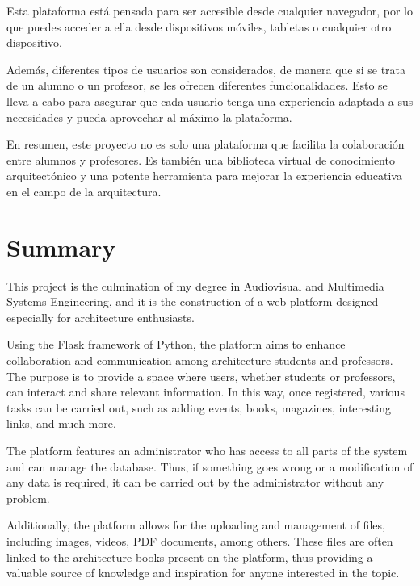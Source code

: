 \documentclass[a4paper, 12pt]{book}
\begin{document}
Esta plataforma está pensada para ser accesible desde cualquier navegador, por lo que puedes acceder a ella desde dispositivos móviles, 
tabletas o cualquier otro dispositivo. 

Además, diferentes tipos de usuarios son considerados, de manera que si se trata de un alumno o un profesor, se les ofrecen diferentes 
funcionalidades. Esto se lleva a cabo para asegurar que cada usuario tenga una experiencia adaptada a sus necesidades y pueda aprovechar 
al máximo la plataforma.

En resumen, este proyecto no es solo una plataforma que facilita la colaboración entre alumnos y profesores. Es también 
una biblioteca virtual de conocimiento arquitectónico y una potente herramienta para mejorar la experiencia educativa en el 
campo de la arquitectura.


\chapter*{Summary}

This project is the culmination of my degree in Audiovisual and Multimedia Systems Engineering, and it is the 
construction of a web platform designed especially for architecture enthusiasts.

Using the Flask framework of Python, the platform aims to enhance collaboration and communication among architecture 
students and professors. The purpose is to provide a space where users, whether students or professors, can interact 
and share relevant information. In this way, once registered, various tasks can be carried out, such as adding events, 
books, magazines, interesting links, and much more.

The platform features an administrator who has access to all parts of the system and can manage the database. Thus, 
if something goes wrong or a modification of any data is required, it can be carried out by the administrator without any problem.

Additionally, the platform allows for the uploading and management of files, including images, videos, PDF documents, 
among others. These files are often linked to the architecture books present on the platform, thus providing a valuable 
source of knowledge and inspiration for anyone interested in the topic.
\end{document}
